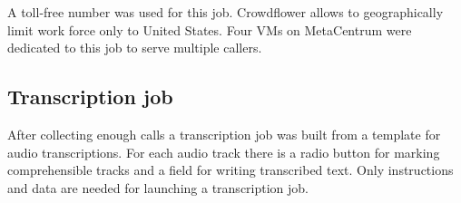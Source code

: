 
\begin{table}[h]
\centering
\hspace*{-3pt}
\end{table}

A toll-free number was used for this job.
Crowdflower allows to geographically limit work force only to United States.
Four VMs on MetaCentrum were dedicated to this job to serve multiple callers. %


\subsection{Transcription job}

After collecting enough calls a transcription job was built from a template for audio transcriptions.
For each audio track there is a radio button for marking comprehensible tracks and a field for writing transcribed text.
Only instructions and data are needed for launching a transcription job.

